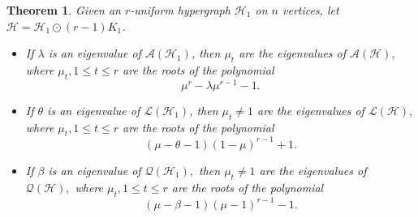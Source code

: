 \documentclass[10pt,a4paper]{article}
\newtheorem{theorem}{Theorem}[section]
\begin{document}
	\begin{theorem}\label{Corona_one_edge}
		Given an $r$-uniform hypergraph $\mathcal{H}_1$ on $n$ vertices, let $ \mathcal{H} = \mathcal{H}_1 \odot (r-1) K_1$. 
		\begin{itemize}
			\item  If $\lambda$ is an eigenvalue of $\mathcal{A}(\mathcal{H}_1)$, 
			then $\mu_t$ are the eigenvalues of $\mathcal{A}(\mathcal{H}),$
			where $\mu_t,1\leq t \leq r$ are the roots of the polynomial $$\mu^r - \lambda \mu^{r-1} -1.$$
			\item  If $\theta$ is an eigenvalue of $\mathcal{L}(\mathcal{H}_1)$,
			then $\mu_t \neq 1$ are the eigenvalues of $\mathcal{L}(\mathcal{H}),$ where $\mu_t, 1 \leq t \leq r$ are the roots of the polynomial 
			$$ (\mu-\theta-1)(1-\mu)^{r-1}+1.$$
			\item If $\beta$ is an eigenvalue of $\mathcal{Q}(\mathcal{H}_1),$ 
			then $\mu_t \neq 1$ are the eigenvalues of $\mathcal{Q}(\mathcal{H}),$ where $\mu_t, 1 \leq t \leq r$ are the roots of the polynomial     $$ (\mu-\beta-1)(\mu-1)^{r-1}-1.$$
		\end{itemize}
	\end{theorem}
\end{document}

